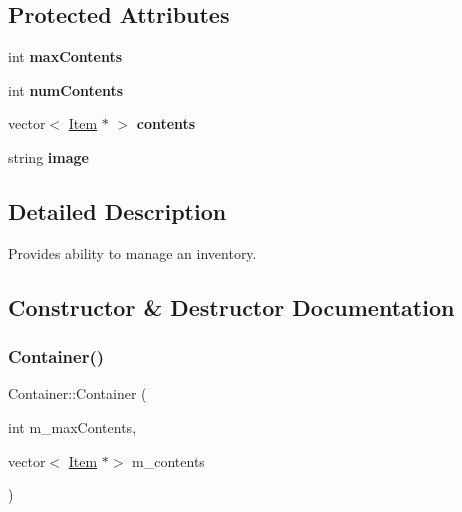 \subsection*{Protected Attributes}
\begin{DoxyCompactItemize}
\item 
\hypertarget{class_container_a3fe28bc57e6f01a6a9bccfba763048d1}{}\label{class_container_a3fe28bc57e6f01a6a9bccfba763048d1} 
int {\bfseries max\+Contents}
\item 
\hypertarget{class_container_a1f3d185e09c7c2123b4fb47ab1abf4a7}{}\label{class_container_a1f3d185e09c7c2123b4fb47ab1abf4a7} 
int {\bfseries num\+Contents}
\item 
\hypertarget{class_container_acbee1b88bfda463e1857b924da41e9b9}{}\label{class_container_acbee1b88bfda463e1857b924da41e9b9} 
vector$<$ \hyperlink{class_item}{Item} $\ast$ $>$ {\bfseries contents}
\item 
\hypertarget{class_container_a61889476a53e34d1659111cd5273232c}{}\label{class_container_a61889476a53e34d1659111cd5273232c} 
string {\bfseries image}
\end{DoxyCompactItemize}


\subsection{Detailed Description}
Provides ability to manage an inventory. 

\subsection{Constructor \& Destructor Documentation}
\hypertarget{class_container_adf46b339e71f73d1b29ba0ba628477d9}{}\label{class_container_adf46b339e71f73d1b29ba0ba628477d9} 
\subsubsection{\texorpdfstring{Container()}{Container()}\hspace{0.1cm}{\footnotesize\ttfamily [1/2]}}
{\footnotesize\ttfamily Container\+::\+Container (\begin{DoxyParamCaption}\item[{int}]{m\+\_\+max\+Contents,  }\item[{vector$<$ \hyperlink{class_item}{Item} $\ast$$>$}]{m\+\_\+contents }\end{DoxyParamCaption})}



